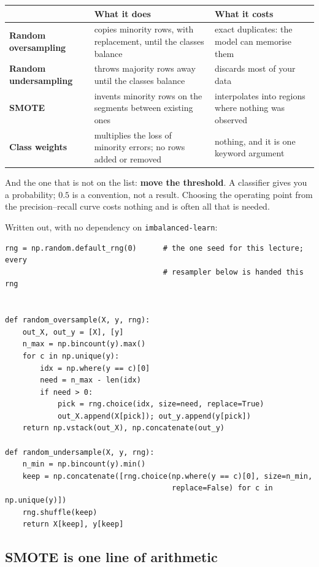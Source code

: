 \documentclass[11pt]{article}
\begin{document}
\begin{center}\small
\begin{tabular}{@{}lp{4.9cm}p{4.6cm}@{}}
  \toprule
  & \textbf{What it does} & \textbf{What it costs}\\
  \midrule
  \textbf{Random oversampling} & copies minority rows, with replacement, until
    the classes balance & exact duplicates: the model can memorise them\\[3pt]
  \textbf{Random undersampling} & throws majority rows away until the classes
    balance & discards most of your data\\[3pt]
  \textbf{SMOTE} & invents minority rows on the segments between existing ones
    & interpolates into regions where nothing was observed\\[3pt]
  \textbf{Class weights} & multiplies the loss of minority errors; no rows
    added or removed & nothing, and it is one keyword argument\\
  \bottomrule
\end{tabular}
\end{center}

And the one that is not on the list: \textbf{move the threshold}. A classifier
gives you a probability; $0.5$ is a convention, not a result. Choosing the
operating point from the precision--recall curve costs nothing and is often
all that is needed.

Written out, with no dependency on \texttt{imbalanced-learn}:

\begin{lstlisting}
rng = np.random.default_rng(0)      # the one seed for this lecture; every
                                    # resampler below is handed this rng


def random_oversample(X, y, rng):
    out_X, out_y = [X], [y]
    n_max = np.bincount(y).max()
    for c in np.unique(y):
        idx = np.where(y == c)[0]
        need = n_max - len(idx)
        if need > 0:
            pick = rng.choice(idx, size=need, replace=True)
            out_X.append(X[pick]); out_y.append(y[pick])
    return np.vstack(out_X), np.concatenate(out_y)

def random_undersample(X, y, rng):
    n_min = np.bincount(y).min()
    keep = np.concatenate([rng.choice(np.where(y == c)[0], size=n_min,
                                      replace=False) for c in np.unique(y)])
    rng.shuffle(keep)
    return X[keep], y[keep]
\end{lstlisting}

\subsection{SMOTE is one line of arithmetic}
\label{sec:smote}
\end{document}
